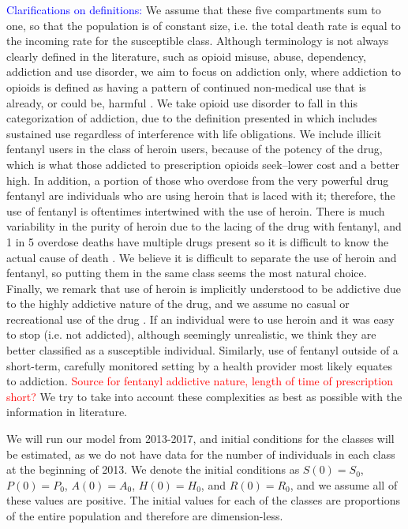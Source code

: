 \documentclass[12pt]{article}
\begin{document}
\textcolor{blue}{Clarifications on definitions:}
We assume that these five compartments sum to one, so that the population is of constant size, i.e. the total death rate is equal to the incoming rate for the susceptible class. Although terminology is not always clearly defined in the literature, such as opioid misuse, abuse, dependency, addiction and use disorder, we aim to focus on addiction only, where addiction to opioids is defined as having a pattern of continued non-medical use that is already, or could be, harmful \cite{Vowles}. We take opioid use disorder to fall in this categorization of addiction, due to the definition presented in \cite{SAMSHA2} which includes sustained use regardless of interference with life obligations. We include illicit fentanyl users in the class of heroin users, because of the potency of the drug, which is what those addicted to prescription opioids seek--lower cost and a better high. In addition, a portion of those who overdose from the very powerful drug fentanyl are individuals who are using heroin that is laced with it; therefore, the use of fentanyl is oftentimes intertwined with the use of heroin. There is much variability in the purity of heroin due to the lacing of the drug with fentanyl, and 1 in 5 overdose deaths have multiple drugs present so it is difficult to know the actual cause of death \cite{CDC4}. We believe it is difficult to separate the use of heroin and fentanyl, so putting them in the same class seems the most natural choice. Finally, we remark that use of heroin is implicitly understood to be addictive due to the highly addictive nature of the drug, and we assume no casual or recreational use of the drug \cite{NIH1}. If an individual were to use heroin and it was easy to stop (i.e. not addicted), although seemingly unrealistic, we think they are better classified as a susceptible individual. Similarly, use of fentanyl outside of a short-term, carefully monitored setting by a health provider most likely equates to addiction. \textcolor{red}{Source for fentanyl addictive nature, length of time of prescription short?} We try to take into account these complexities as best as possible with the information in literature.


We will run our model from 2013-2017, and initial conditions for the classes will be estimated, as we do not have data for the number of individuals in each class at the beginning of 2013.  
We denote the initial conditions as
$S(0)=S_{0}$, $P(0)=P_{0}$, $A(0)=A_{0}$, $H(0)=H_{0}$, and $R(0)=R_{0}$, and we assume all of these values are positive. The initial values for each of the classes are proportions of the entire population and therefore are dimension-less.
\end{document}
